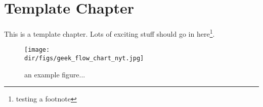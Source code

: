 \chapter{Template Chapter}
This is a template chapter. Lots of exciting stuff should go in here\footnote{testing a footnote}.


\begin{figure}[htbp]
  \centering
  \texttt{[image: \\dir/figs/geek\_flow\_chart\_nyt.jpg]}
  \caption{an example figure...}
  \label{fig.example}
\end{figure}
